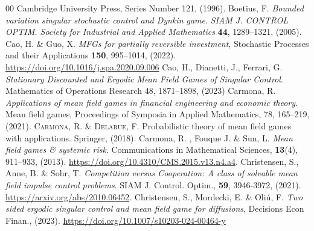 \documentclass{article}
\begin{document}
\begin{thebibliography}{00}
Cambridge University Press, Series Number 121, (1996).
Boetius, F. \textit{Bounded variation singular stochastic control and Dynkin game}.
\textit{SIAM J. CONTROL OPTIM. Society for Industrial and Applied Mathematics}
 \textbf{44}, 1289–1321, (2005).
Cao, H. \& Guo, X. 
\textit{MFGs for partially reversible investment},
Stochastic Processes and their Applications \textbf{150}, 995--1014, (2022). 
\url{https://doi.org/10.1016/j.spa.2020.09.006}
Cao, H., Dianetti, J., Ferrari, G. 
\textit{Stationary Discounted and Ergodic Mean Field Games of Singular Control}. 
Mathematics of Operations Research 48, 1871--1898, (2023)
Carmona, R. 
\textit{Applications of mean field games in financial engineering and economic theory}.
Mean field games, 
Proceedings of Symposia in Applied Mathematics, 78, 165--219, (2021).
\textsc{Carmona, R. \& Delarue, F.} 
Probabilistic theory of mean field games with applications.
Springer, (2018).
Carmona, R. , Fouque J. \& Sun, L. \textit{Mean field games \&
systemic risk}. Communications in Mathematical Sciences, \textbf{13}(4), 911–933, (2013).
\url{https://doi.org/10.4310/CMS.2015.v13.n4.a4}.
      Christensen, S., Anne, B. \& Sohr, T.  
      \textit{Competition versus Cooperation: A class of solvable mean field impulse control problems}. 
      SIAM J. Control. Optim., \textbf{59}, 3946-3972, (2021).
      \url{https://arxiv.org/abs/2010.06452}.
Christensen, S., Mordecki, E. \& Oli\'u, F. 
\textit{Two sided ergodic singular control and mean field game for diffusions}, Decisions Econ Finan., (2023).
 \url{https://doi.org/10.1007/s10203-024-00464-y}


\end{thebibliography}
\end{document}
